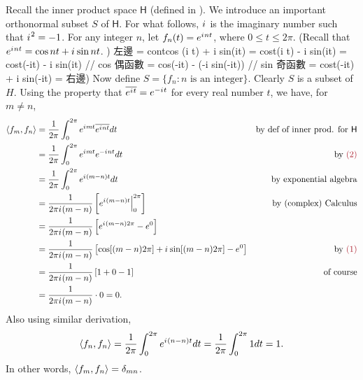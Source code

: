 \begin{example} \label{example 6.1.9}
Recall the inner product space \(\textsf{H}\) (defined in ).
We introduce an important orthonormal subset \(S\) of \(\textsf{H}\).
For what follows, \({i\mkern1mu}\) is the imaginary number such that \({i\mkern1mu}^2 = -1\).
For any integer \(n\), let \(f_n(t) = e^{{i\mkern1mu} n t}\), where \(0 \le t \le 2 \pi\).
(Recall that \(e^{{i\mkern1mu} nt} = \cos nt + {i\mkern1mu} \sin nt\). )
左邊 = cont{cos (i t) + i sin(it)}
= cost(i t) - i sin(it)
= cost(-it) - i sin(it) // cos 偶函數
= cos(-it) - (-i sin(-it)) // sin 奇函數
= cost(-it) + i sin(-it)
= 右邊)
Now define \(S = \{ f_n : n \text{ is an integer} \}\).
Clearly \(S\) is a subset of \(H\).
Using the property that \(\overline{e^{{i\mkern1mu} t}} = e^{-{i\mkern1mu} t}\)  for every real number \(t\), we have, for \(m \ne n\),
\begin{align*}
    \LG f_m, f_n \RG & = \frac{1}{2\pi} \int_0^{2\pi} e^{\iu m t} \conjugatet{e^{\iu n t}} dt & \text{by def of inner prod. for \(\textsf{H}\)} \\
        & = \frac{1}{2\pi} \int_0^{2\pi} e^{\iu m t} e^{-\iu n t} dt & \text{by \MAROON{(2)}} \\
        & = \frac{1}{2\pi} \int_0^{2\pi} e^{\iu (m - n) t} dt & \text{by exponential algebra} \\
        & = \frac{1}{2\pi \iu(m - n)} \left[ e^{\iu(m - n)t} \Big|_0^{2\pi} \right] & \text{by (complex) Calculus} \\
        & = \frac{1}{2\pi \iu(m - n)} \left[ e^{\iu(m - n)2\pi} - e^0 \right] \\
        & = \frac{1}{2\pi \iu(m - n)} \left[ \cos[(m - n)2\pi] + \iu \sin[(m - n)2\pi] - e^0 \right] & \text{by \MAROON{(1)}} \\
        & = \frac{1}{2\pi \iu(m - n)} \left[ 1 + 0 - 1 \right] & \text{of course} \\
        & = \frac{1}{2\pi \iu(m - n)} \cdot 0 = 0.
\end{align*}
Also using similar derivation,
\[
    \left< f_n, f_n \right> = \frac{1}{2\pi} \int_0^{2\pi} e^{{i\mkern1mu}(n - n)t} dt = \frac{1}{2\pi} \int_0^{2\pi} 1 dt = 1. 
\]
In other words, \(\left< f_m, f_n \right> = \delta_{mn}\).
\end{example}